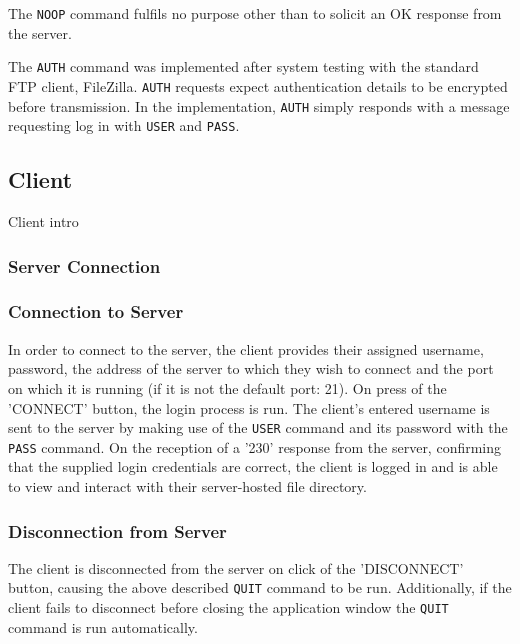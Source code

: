\documentclass[10pt,twocolumn]{witseiepaper}
\begin{document}
The \texttt{NOOP} command fulfils no purpose other than to solicit an OK response from the server.

The \texttt{AUTH} command was implemented after system testing with the standard FTP client, FileZilla. \texttt{AUTH} requests expect authentication details to be encrypted before transmission. In the implementation, \texttt{AUTH} simply responds with a message requesting log in with \texttt{USER} and \texttt{PASS}.


\subsection{Client}



Client intro


\subsubsection{Server Connection}
\subsubsection*{Connection to Server}
In order to connect to the server, the client provides their assigned username, password, the address of the server to which they wish to connect and the port on which it is running (if it is not the default port: 21). On press of the 'CONNECT' button, the login process is run. The client's entered username is sent to the server by making use of the \texttt{USER} command and its password with the \texttt{PASS} command. On the reception of a '230' response from the server, confirming that the supplied login credentials are correct, the client is logged in and is able to view and interact with their server-hosted file directory.
 
\subsubsection*{Disconnection from Server} 
The client is disconnected from the server on click of the 'DISCONNECT' button, causing the above described \texttt{QUIT} command to be run. Additionally, if the client fails to disconnect before closing the application window the \texttt{QUIT} command is run automatically.
\end{document}
